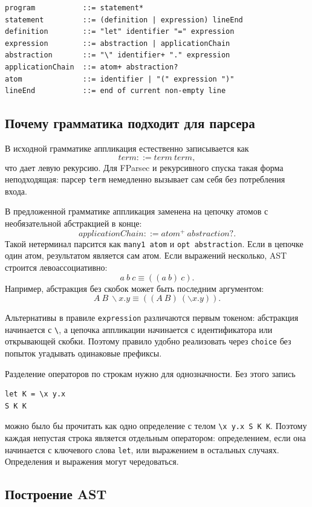\documentclass[12pt,a4paper]{article}
\begin{document}
\begin{verbatim}
program           ::= statement*
statement         ::= (definition | expression) lineEnd
definition        ::= "let" identifier "=" expression
expression        ::= abstraction | applicationChain
abstraction       ::= "\" identifier+ "." expression
applicationChain  ::= atom+ abstraction?
atom              ::= identifier | "(" expression ")"
lineEnd           ::= end of current non-empty line
\end{verbatim}

\subsection*{Почему грамматика подходит для парсера}

В исходной грамматике аппликация естественно записывается как
\[
term ::= term\ term,
\]
что дает левую рекурсию. Для FParsec и рекурсивного спуска такая форма
неподходящая: парсер \verb|term| немедленно вызывает сам себя без
потребления входа.

В предложенной грамматике аппликация заменена на цепочку атомов
с необязательной абстракцией в конце:
\[
applicationChain ::= atom^+\ abstraction?.
\]
Такой нетерминал парсится как \verb|many1 atom| и
\verb|opt abstraction|. Если в цепочке один атом, результатом является
сам атом. Если выражений несколько, AST строится левоассоциативно:
\[
a\ b\ c \equiv ((a\ b)\ c).
\]
Например, абстракция без скобок может быть последним аргументом:
\[
A\ B\ \backslash x.y \equiv ((A\ B)\ (\backslash x.y)).
\]

Альтернативы в правиле \verb|expression| различаются первым токеном:
абстракция начинается с \verb|\|, а цепочка аппликации начинается с
идентификатора или открывающей скобки. Поэтому правило удобно реализовать
через \verb|choice| без попыток угадывать одинаковые префиксы.

Разделение операторов по строкам нужно для однозначности. Без этого
запись
\begin{verbatim}
let K = \x y.x
S K K
\end{verbatim}
можно было бы прочитать как одно определение с телом \verb|\x y.x S K K|.
Поэтому каждая непустая строка является отдельным оператором:
определением, если она начинается с ключевого слова \verb|let|, или
выражением в остальных случаях. Определения и выражения могут
чередоваться.

\subsection*{Построение AST}
\end{document}
